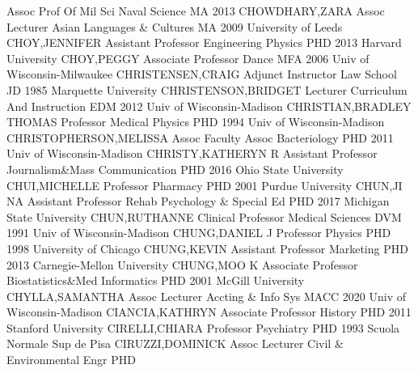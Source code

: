 \documentclass[
]{article}
\begin{document}
\textbar Assoc Prof Of Mil Sci \textbar Naval Science \textbar MA 2013
\textbar{}  \textbar CHOWDHARY,ZARA \textbar Assoc Lecturer
\textbar Asian Languages \& Cultures \textbar MA 2009 University of
Leeds \textbar{}  \textbar CHOY,JENNIFER \textbar Assistant
Professor \textbar Engineering Physics \textbar PHD 2013 Harvard
University \textbar{}  \textbar CHOY,PEGGY \textbar Associate
Professor \textbar Dance \textbar MFA 2006 Univ of Wisconsin-Milwaukee
\textbar{}  \textbar CHRISTENSEN,CRAIG \textbar Adjunct
Instructor \textbar Law School \textbar JD 1985 Marquette University
\textbar{}  \textbar CHRISTENSON,BRIDGET \textbar Lecturer
\textbar Curriculum And Instruction \textbar EDM 2012 Univ of
Wisconsin-Madison \textbar{}  \textbar CHRISTIAN,BRADLEY
THOMAS \textbar Professor \textbar Medical Physics \textbar PHD 1994
Univ of Wisconsin-Madison \textbar{} 
\textbar CHRISTOPHERSON,MELISSA \textbar Assoc Faculty Assoc
\textbar Bacteriology \textbar PHD 2011 Univ of Wisconsin-Madison
\textbar{}  \textbar CHRISTY,KATHERYN R \textbar Assistant
Professor \textbar Journalism\&Mass Communication \textbar PHD 2016 Ohio
State University \textbar{}  \textbar CHUI,MICHELLE
\textbar Professor \textbar Pharmacy \textbar PHD 2001 Purdue University
\textbar{}  \textbar CHUN,JI NA \textbar Assistant Professor
\textbar Rehab Psychology \& Special Ed \textbar PHD 2017 Michigan State
University \textbar{}  \textbar CHUN,RUTHANNE
\textbar Clinical Professor \textbar Medical Sciences \textbar DVM 1991
Univ of Wisconsin-Madison \textbar{}  \textbar CHUNG,DANIEL J
\textbar Professor \textbar Physics \textbar PHD 1998 University of
Chicago \textbar{}  \textbar CHUNG,KEVIN \textbar Assistant
Professor \textbar Marketing \textbar PHD 2013 Carnegie-Mellon
University \textbar{}  \textbar CHUNG,MOO K
\textbar Associate Professor \textbar Biostatistics\&Med Informatics
\textbar PHD 2001 McGill University \textbar{} 
\textbar CHYLLA,SAMANTHA \textbar Assoc Lecturer \textbar Accting \&
Info Sys \textbar MACC 2020 Univ of Wisconsin-Madison \textbar{}
 \textbar CIANCIA,KATHRYN \textbar Associate Professor
\textbar History \textbar PHD 2011 Stanford University \textbar{}
 \textbar CIRELLI,CHIARA \textbar Professor
\textbar Psychiatry \textbar PHD 1993 Scuola Normale Sup de Pisa
\textbar{}  \textbar CIRUZZI,DOMINICK \textbar Assoc Lecturer
\textbar Civil \& Environmental Engr \textbar PHD \textbar{} 
\end{document}
